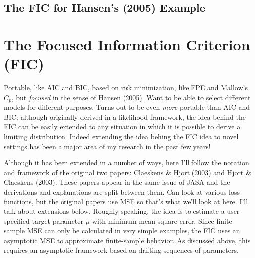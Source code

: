 \documentclass[12pt]{article}
\theoremstyle{definition}
\begin{document}
\subsection{The FIC for Hansen's (2005) Example}



\section{The Focused Information Criterion (FIC)}
Portable, like AIC and BIC, based on risk minimization, like FPE and Mallow's $C_p$, but \emph{focused} in the sense of Hansen (2005). Want to be able to select different models for different purposes. Turns out to be even \emph{more} portable than AIC and BIC: although originally derived in a likelihood framework, the idea behind the FIC can be easily extended to any situation in which it is possible to derive a limiting distribution. Indeed extending the idea behing the FIC idea to novel settings has been a major area of my research in the past few years! 

Although it has been extended in a number of ways, here I'll follow the notation and framework of the original two papers: Claeskens \& Hjort (2003) and Hjort \& Claeskens (2003). These papers appear in the same issue of JASA and the derivations and explanations are split between them. Can look at various loss functions, but the original papers use MSE so that's what we'll look at here. I'll talk about extensions below. Roughly speaking, the idea is to estimate a user-specified target parameter $\mu$ with minimum mean-square error. Since finite-sample MSE can only be calculated in very simple examples, the FIC uses an asymptotic MSE to approximate finite-sample behavior. As discussed above, this requires an asymptotic framework based on drifting sequences of parameters. 
\end{document}
